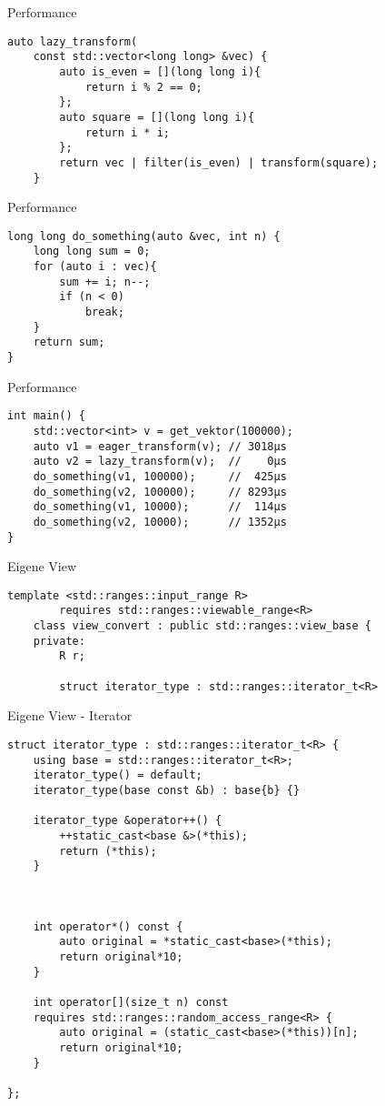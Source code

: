 \begin{frame}[fragile]{Performance}
    \begin{verbatim}
auto lazy_transform(
    const std::vector<long long> &vec) {
        auto is_even = [](long long i){
            return i % 2 == 0;
        };
        auto square = [](long long i){
            return i * i;
        };
        return vec | filter(is_even) | transform(square);
    }
    \end{verbatim}
\end{frame}

\begin{frame}[fragile]{Performance}
    \begin{verbatim}
long long do_something(auto &vec, int n) {
    long long sum = 0;
    for (auto i : vec){
        sum += i; n--;
        if (n < 0)
            break;
    }
    return sum;
}
    \end{verbatim}
\end{frame}

\begin{frame}[fragile]{Performance}
    \begin{verbatim}
int main() {
    std::vector<int> v = get_vektor(100000);
    auto v1 = eager_transform(v); // 3018µs
    auto v2 = lazy_transform(v);  //    0µs
    do_something(v1, 100000);     //  425µs
    do_something(v2, 100000);     // 8293µs
    do_something(v1, 10000);      //  114µs
    do_something(v2, 10000);      // 1352µs
}
    \end{verbatim}
\end{frame}

\begin{frame}[fragile]{Eigene View}
    \begin{verbatim}
template <std::ranges::input_range R>
        requires std::ranges::viewable_range<R>
    class view_convert : public std::ranges::view_base {
    private:
        R r;
    
        struct iterator_type : std::ranges::iterator_t<R>
    \end{verbatim}
\end{frame}

\begin{frame}{Eigene View - Iterator}
    \begin{verbatim}
struct iterator_type : std::ranges::iterator_t<R> {
    using base = std::ranges::iterator_t<R>;
    iterator_type() = default;
    iterator_type(base const &b) : base{b} {}

    iterator_type &operator++() {
        ++static_cast<base &>(*this);
        return (*this);
    }



    int operator*() const {
        auto original = *static_cast<base>(*this);
        return original*10;
    }

    int operator[](size_t n) const
    requires std::ranges::random_access_range<R> {
        auto original = (static_cast<base>(*this))[n];
        return original*10;
    }

};
    \end{verbatim}
\end{frame}

